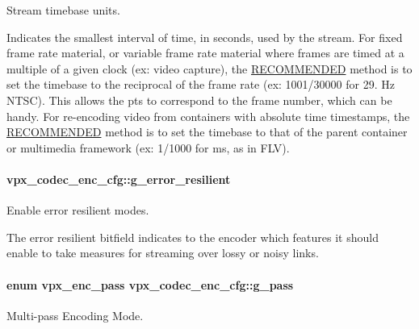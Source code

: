 Stream timebase units. 

Indicates the smallest interval of time, in seconds, used by the stream. For fixed frame rate material, or variable frame rate material where frames are timed at a multiple of a given clock (ex\-: video capture), the \hyperlink{rfc2119_RECOMMENDED}{R\-E\-C\-O\-M\-M\-E\-N\-D\-E\-D} method is to set the timebase to the reciprocal of the frame rate (ex\-: 1001/30000 for 29. Hz N\-T\-S\-C). This allows the pts to correspond to the frame number, which can be handy. For re-\/encoding video from containers with absolute time timestamps, the \hyperlink{rfc2119_RECOMMENDED}{R\-E\-C\-O\-M\-M\-E\-N\-D\-E\-D} method is to set the timebase to that of the parent container or multimedia framework (ex\-: 1/1000 for ms, as in F\-L\-V). \hypertarget{structvpx__codec__enc__cfg_a4e17173b66ca0d7dfba9978625d7ba76}{
\paragraph[{g\-\_\-error\-\_\-resilient}]{ vpx\-\_\-codec\-\_\-enc\-\_\-cfg\-::g\-\_\-error\-\_\-resilient}}\label{structvpx__codec__enc__cfg_a4e17173b66ca0d7dfba9978625d7ba76}


Enable error resilient modes. 

The error resilient bitfield indicates to the encoder which features it should enable to take measures for streaming over lossy or noisy links. \hypertarget{structvpx__codec__enc__cfg_a70d62d87aae7d1168746577f14a6dccf}{
\paragraph[{g\-\_\-pass}]{\setlength{\rightskip}{0pt plus 5cm}enum {\bf vpx\-\_\-enc\-\_\-pass} vpx\-\_\-codec\-\_\-enc\-\_\-cfg\-::g\-\_\-pass}}\label{structvpx__codec__enc__cfg_a70d62d87aae7d1168746577f14a6dccf}


Multi-\/pass Encoding Mode. 

